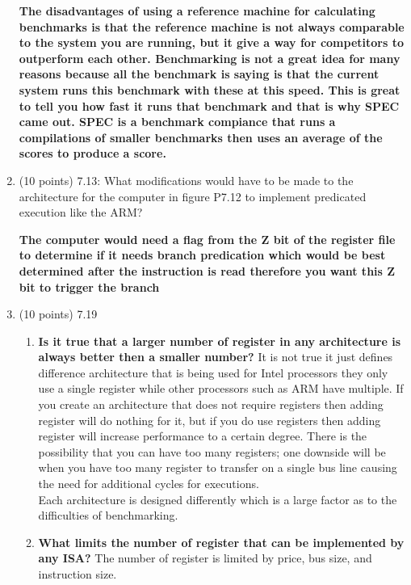 \documentclass[letterpaper,10pt,onecolumn,titlepage]{article}
\begin{document}
\begin{enumerate}
\begin{mdframed}[style=MyFrame, backgroundcolor=red]
\textbf{ The disadvantages of using a reference machine for calculating benchmarks is that the reference machine is not always comparable to the system you are running, but it give a way for competitors to outperform each other. Benchmarking is not a great idea for many reasons because all the benchmark is saying is that the current system runs this benchmark with these at this speed. This is great to tell you how fast it runs that benchmark and that is why SPEC came out. SPEC is a benchmark compiance that runs a compilations of smaller benchmarks then uses an average of the scores to produce a score. }

\end{mdframed}
\item (10 points) 7.13: What modifications would have to be made to the architecture for the computer in figure P7.12 to implement predicated execution like the ARM?
\begin{mdframed}[style=MyFrame, backgroundcolor=red]
\textbf{The computer would need a flag from the Z bit of the register file to determine if it needs branch predication which would be best determined after the instruction is read therefore you want this Z bit to trigger the branch  }
\end{mdframed}
\newpage
\item (10 points) 7.19
\begin{mdframed}[style=MyFrame, backgroundcolor=red]
\begin{enumerate}
\item \textbf{Is it true that a larger number of register in any architecture is always better then a smaller number?} It is not true it just defines difference architecture that is being used for Intel processors they only use a single register while other processors such as ARM have multiple.  If you create an architecture that does not require registers then adding register will do nothing for it, but if you do use registers then adding register will increase performance to a certain degree. There is the possibility that you can have too many registers; one downside will be when you have too many register to transfer on a single bus line causing the need for additional cycles for executions. \\ 
Each architecture is designed differently which is a large factor as to the difficulties of benchmarking. 
\item \textbf{What limits the number of register that can be implemented by any ISA? } The number of register is limited by price, bus size, and instruction size.

\end{enumerate}
\end{mdframed}
\end{enumerate}
\end{document}
